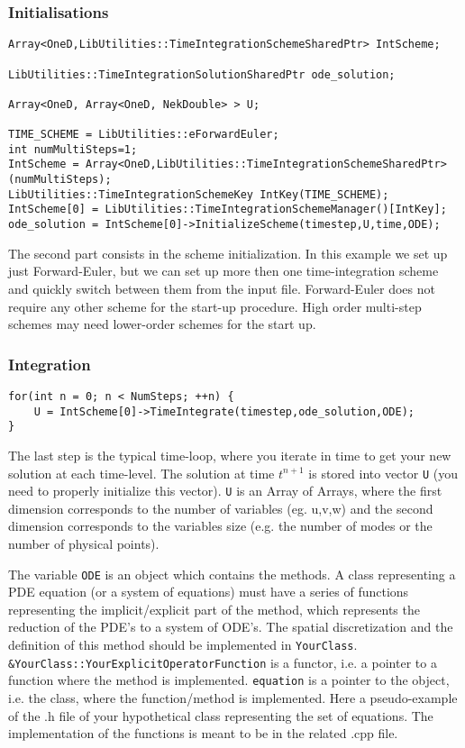 \subsubsection{Initialisations}
\begin{lstlisting}[style=C++Style]
Array<OneD,LibUtilities::TimeIntegrationSchemeSharedPtr> IntScheme;
    
LibUtilities::TimeIntegrationSolutionSharedPtr ode_solution;
    
Array<OneD, Array<OneD, NekDouble> > U;

TIME_SCHEME = LibUtilities::eForwardEuler; 
int numMultiSteps=1; 
IntScheme = Array<OneD,LibUtilities::TimeIntegrationSchemeSharedPtr>(numMultiSteps); 
LibUtilities::TimeIntegrationSchemeKey IntKey(TIME_SCHEME); 
IntScheme[0] = LibUtilities::TimeIntegrationSchemeManager()[IntKey];
ode_solution = IntScheme[0]->InitializeScheme(timestep,U,time,ODE);
\end{lstlisting}
The second part consists in the scheme initialization. In this example we set up
just Forward-Euler, but we can set up more then one time-integration scheme and
quickly switch between them from the input file.
Forward-Euler does not require any other scheme for the start-up procedure. High
order multi-step schemes may need lower-order schemes for the start up.

\subsubsection{Integration}
\begin{lstlisting}[style=C++Style]
for(int n = 0; n < NumSteps; ++n) {
    U = IntScheme[0]->TimeIntegrate(timestep,ode_solution,ODE);
}
\end{lstlisting}
The last step is the typical time-loop, where you iterate in time to get
your new solution at each time-level.
The solution at time $t^{n+1}$ is stored into vector \texttt{U} (you need
to properly initialize this vector).
\texttt{U} is an Array of Arrays, where the first dimension corresponds to
the number of variables (eg. u,v,w) and the second dimension corresponds to the
variables size (e.g. the number of modes or the number of physical points).

The variable \texttt{ODE} is an object which contains the methods. A class
representing a PDE equation (or a system of equations) must have a series of
functions representing the implicit/explicit part of the method, which
represents the reduction of the PDE's to a system of ODE's.
The spatial discretization and the definition of this method should be
implemented in \texttt{YourClass}.
\texttt{\&YourClass::YourExplicitOperatorFunction} is a functor, i.e. a pointer
to a function where the method is implemented. \texttt{equation} is a pointer
to the object, i.e. the class, where the function/method is implemented.
Here a pseudo-example of the .h file of your hypothetical class representing the
set of equations.
The implementation of the functions is meant to be in the related .cpp file.


